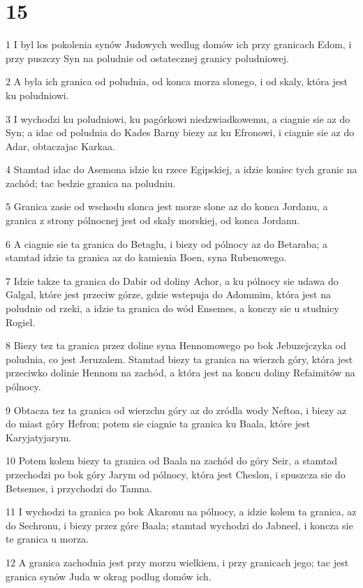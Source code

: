 \chapter{15}

\par 1 I byl los pokolenia synów Judowych wedlug domów ich przy granicach Edom, i przy puszczy Syn na poludnie od ostatecznej granicy poludniowej.
\par 2 A byla ich granica od poludnia, od konca morza slonego, i od skaly, która jest ku poludniowi.
\par 3 I wychodzi ku poludniowi, ku pagórkowi niedzwiadkowemu, a ciagnie sie az do Syn; a idac od poludnia do Kades Barny biezy az ku Efronowi, i ciagnie sie az do Adar, obtaczajac Karkaa.
\par 4 Stamtad idac do Asemona idzie ku rzece Egipskiej, a idzie koniec tych granic na zachód; tac bedzie granica na poludniu.
\par 5 Granica zasie od wschodu slonca jest morze slone az do konca Jordanu, a granica z strony pólnocnej jest od skaly morskiej, od konca Jordanu.
\par 6 A ciagnie sie ta granica do Betaglu, i biezy od pólnocy az do Betaraba; a stamtad idzie ta granica az do kamienia Boen, syna Rubenowego.
\par 7 Idzie takze ta granica do Dabir od doliny Achor, a ku pólnocy sie udawa do Galgal, które jest przeciw górze, gdzie wstepuja do Adommim, która jest na poludnie od rzeki, a idzie ta granica do wód Ensemes, a konczy sie u studnicy Rogiel.
\par 8 Biezy tez ta granica przez doline syna Hennomowego po bok Jebuzejczyka od poludnia, co jest Jeruzalem. Stamtad biezy ta granica na wierzch góry, która jest przeciwko dolinie Hennom na zachód, a która jest na koncu doliny Refaimitów na pólnocy.
\par 9 Obtacza tez ta granica od wierzchu góry az do zródla wody Neftoa, i biezy az do miast góry Hefron; potem sie ciagnie ta granica ku Baala, które jest Karyjatyjarym.
\par 10 Potem kolem biezy ta granica od Baala na zachód do góry Seir, a stamtad przechodzi po bok góry Jarym od pólnocy, która jest Cheslon, i spuszcza sie do Betsemes, i przychodzi do Tamna.
\par 11 I wychodzi ta granica po bok Akaronu na pólnocy, a idzie kolem ta granica, az do Sechronu, i biezy przez góre Baala; stamtad wychodzi do Jabneel, i koncza sie te granica u morza.
\par 12 A granica zachodnia jest przy morzu wielkiem, i przy granicach jego; tac jest granica synów Juda w okrag podlug domów ich.
